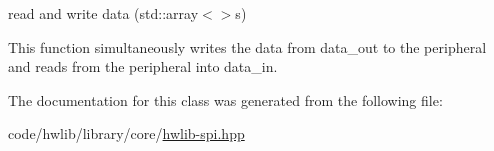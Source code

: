 read and write data (std\+::array$<$$>$\textquotesingle{}s)

This function simultaneously writes the data from data\+\_\+out to the peripheral and reads from the peripheral into data\+\_\+in. 

The documentation for this class was generated from the following file\+:\begin{DoxyCompactItemize}
\item 
code/hwlib/library/core/\hyperlink{hwlib-spi_8hpp}{hwlib-\/spi.\+hpp}\end{DoxyCompactItemize}

